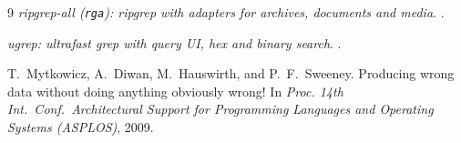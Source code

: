 \documentclass[11pt,letterpaper]{article}
\begin{document}
\begin{thebibliography}{9}
\newblock \emph{ripgrep-all (\texttt{rga}): ripgrep with adapters for
  archives, documents and media}.
\newblock {}.

\newblock \emph{ugrep: ultrafast grep with query UI, hex and binary
  search}.
\newblock {}.

T.~Mytkowicz, A.~Diwan, M.~Hauswirth, and P.~F.~Sweeney.
\newblock Producing wrong data without doing anything obviously wrong!
\newblock In \emph{Proc. 14th Int.\ Conf.\ Architectural Support for
  Programming Languages and Operating Systems (ASPLOS)}, 2009.

\end{thebibliography}
\end{document}
